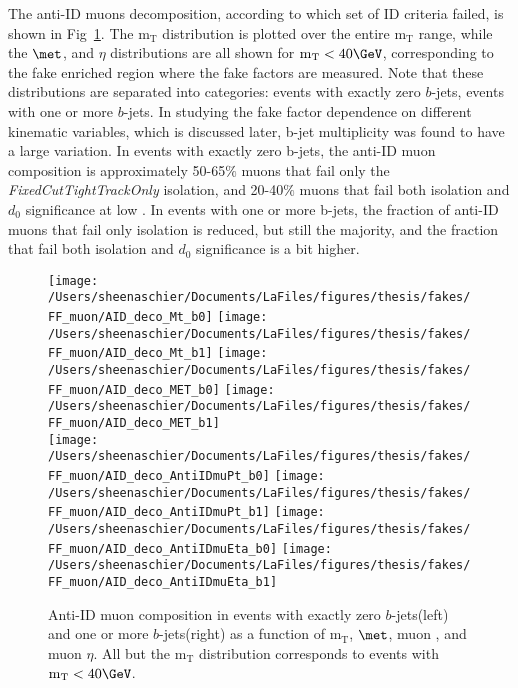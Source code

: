 The anti-ID muons decomposition, according to which set of ID criteria failed, is shown in Fig~\ref{fig:muDeco}. The $\mathrm{m_T}$ distribution is plotted over the entire $\mathrm{m_T}$ range, while the $\met$, \pt{} and $\eta$ distributions are all shown for $\mathrm{m_T} <40\GeV$, corresponding to the fake enriched region where the fake factors are measured.  Note that these distributions are separated into categories: events with exactly zero $b$-jets, events with one or more $b$-jets.  In studying the fake factor dependence on different kinematic variables, which is discussed later, b-jet multiplicity was found to have a large variation.  In events with exactly zero b-jets, the anti-ID muon composition is approximately 50-65$\%$ muons that fail only the \textit{FixedCutTightTrackOnly} isolation, and 20-40$\%$ muons that fail both isolation and $d_0$ significance at low \pt.  In events with one or more b-jets, the fraction of anti-ID muons that fail only isolation is reduced, but still the majority, and the fraction that fail both isolation and $d_0$ significance is a bit higher.     
\begin{figure}
        \centering
        \texttt{[image: /Users/sheenaschier/Documents/LaFiles/figures/thesis/fakes/FF\_muon/AID\_deco\_Mt\_b0]}
                \texttt{[image: /Users/sheenaschier/Documents/LaFiles/figures/thesis/fakes/FF\_muon/AID\_deco\_Mt\_b1]}
        \texttt{[image: /Users/sheenaschier/Documents/LaFiles/figures/thesis/fakes/FF\_muon/AID\_deco\_MET\_b0]}
        \texttt{[image: /Users/sheenaschier/Documents/LaFiles/figures/thesis/fakes/FF\_muon/AID\_deco\_MET\_b1]}\\
                \texttt{[image: /Users/sheenaschier/Documents/LaFiles/figures/thesis/fakes/FF\_muon/AID\_deco\_AntiIDmuPt\_b0]}
                        \texttt{[image: /Users/sheenaschier/Documents/LaFiles/figures/thesis/fakes/FF\_muon/AID\_deco\_AntiIDmuPt\_b1]}
        \texttt{[image: /Users/sheenaschier/Documents/LaFiles/figures/thesis/fakes/FF\_muon/AID\_deco\_AntiIDmuEta\_b0]}
        \texttt{[image: /Users/sheenaschier/Documents/LaFiles/figures/thesis/fakes/FF\_muon/AID\_deco\_AntiIDmuEta\_b1]}\\
        \caption{Anti-ID muon composition in events with exactly zero $b$-jets(left) and one or more $b$-jets(right) as a function of $\mathrm{m_T}$, $\met$, muon \pt{}, and muon $\eta$. All but the $\mathrm{m_T}$ distribution corresponds to events with $\mathrm{m_T} < 40\GeV$.}
        \label{fig:muDeco}
\end{figure}


